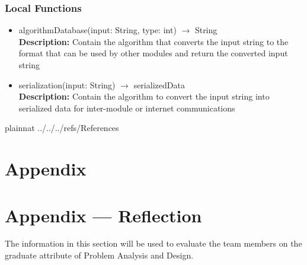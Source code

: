 \documentclass[12pt, titlepage]{article}
\begin{document}
\subsubsection{Local Functions}
\begin{itemize}
\item algorithmDatabase(input: String, type: int) $\rightarrow$ String\\
\textbf{Description:} Contain the algorithm that converts the input string to the format that can be used by other modules and return the converted input string

\item serialization(input: String) $\rightarrow$ serializedData\\
\textbf{Description:} Contain the algorithm to convert the input string into serialized data for inter-module or internet communications
\end{itemize}





 {plainnat}
 {../../../refs/References}

\newpage

\section{Appendix} \label{Appendix}


\newpage{}

\section*{Appendix --- Reflection}


The information in this section will be used to evaluate the team members on the
graduate attribute of Problem Analysis and Design.
\end{document}
